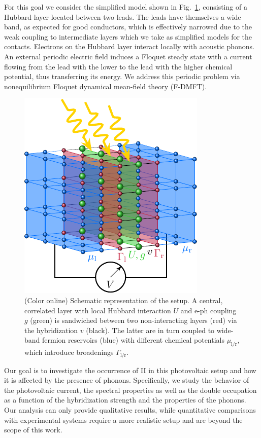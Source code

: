 \documentclass[aps,prb,groupedaddress,showpacs,twocolumn,superscriptaddress,10pt]{revtex4-2}
\begin{document}
For this goal we consider the simplified model shown in Fig.~\ref{fig:setup}, consisting of a Hubbard layer located between two leads. The leads have themselves a wide band, as expected for good conductors, which is effectively narrowed due to the weak coupling to intermediate layers which we take as simplified models for the contacts. Electrons on the Hubbard layer interact locally with acoustic phonons. An external periodic electric field induces a Floquet steady state with a current flowing from the lead with the lower to the lead with the higher chemical potential, thus transferring its energy. We address this periodic problem via nonequilibrium Floquet dynamical mean-field theory (F-DMFT).            
        
\begin{figure}[b] 
\includegraphics[width=0.8\linewidth]{Fig1.pdf}
\caption{(Color online) Schematic representation of the setup. A central, correlated layer with local Hubbard interaction $U$ and e-ph coupling $g$ (green) is sandwiched between two non-interacting layers (red) via the hybridization $v$ (black). The latter are in turn coupled to wide-band fermion reservoirs (blue) with different chemical potentials $\mu_{\text{l}/\text{r}}$, which introduce broadenings $\Gamma_{\text{l}/\text{r}}$.}
\label{fig:setup}
\end{figure}      
    
Our goal is to investigate the occurrence of II in this photovoltaic setup and how it is affected by the presence of phonons. Specifically, we study the behavior of the photovoltaic current, the spectral properties as well as the double occupation as a function of the hybridization strength and the properties of the phonons. Our analysis can only provide qualitative results, while quantitative comparisons with experimental systems require a more realistic setup and are beyond the scope of this work.
 
\end{document}
